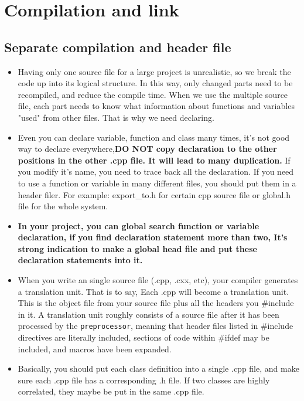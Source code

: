 \documentclass[a4paper,11pt,twoside]{book}
\begin{document}
\section{Compilation and link}

\subsection{Separate compilation and header file}
\begin{itemize}
	\item Having only one source file for a large project is unrealistic, so we break the code up into its logical structure. In this way, only changed parts need to be recompiled, and reduce the compile time. When we use the multiple source file, each part needs to know what information about functions and variables "used" from other files. That is why we need declaring.
	
	\item Even you can declare variable, function and class many times, it's not good way to declare everywhere,\textbf{DO NOT copy declaration to the other positions in the other .cpp file. It will lead to many duplication.} If you modify it's name, you need to trace back all the declaration. If you need to use a function or variable in many different files, you should put them in a header filer. For example: export\_to.h for certain cpp source file or global.h file for the whole system.

	
	\item \textbf{In your project, you can global search function or variable declaration, if you find declaration statement more than two, It's strong indication to make a global head file and put these declaration statements into it.}
	
	\item When you write an single source file (.cpp, .cxx, etc),  your compiler generates a translation unit. That is to say, Each .cpp will become a translation unit. This is the object file from your source file plus all the headers you \#include in it.  A translation unit roughly consists of a source file after it has been processed by the \texttt{preprocessor}, meaning that header files listed in \#include directives are literally included, sections of code within \#ifdef may be included, and macros have been expanded.
	
	\item Basically, you should put each class definition into a single .cpp file, and make sure each .cpp file has a corresponding .h file.  If two classes are highly correlated, they maybe be put in the same .cpp file.
	

\end{itemize}
\end{document}
